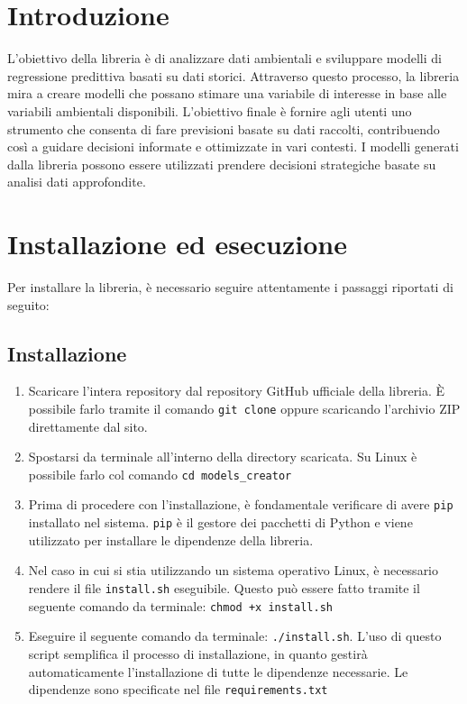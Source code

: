 \documentclass{rapportECL}
\newcommand{\rootDirectory}{models\_creator}
\begin{document}


        
\margins %
\mytitlepage %
\toc %



\cleardoublepage 

\chapter{Introduzione}

L'obiettivo della libreria è di analizzare dati ambientali e sviluppare modelli di regressione predittiva basati su dati storici. 
Attraverso questo processo, la libreria mira a creare modelli che possano stimare una variabile di interesse in base alle variabili ambientali disponibili. 
L'obiettivo finale è fornire agli utenti uno strumento che consenta di fare previsioni basate su dati raccolti, contribuendo così a guidare decisioni informate 
e ottimizzate in vari contesti. I modelli generati dalla libreria possono essere utilizzati prendere decisioni strategiche basate su analisi dati approfondite.

\chapter{Installazione ed esecuzione}
Per installare la libreria, è necessario seguire attentamente i passaggi riportati di seguito:

\section*{Installazione}
\begin{enumerate}
  \item Scaricare l'intera repository dal repository GitHub ufficiale della libreria. 
  È possibile farlo tramite il comando \texttt{git clone} oppure scaricando l'archivio ZIP direttamente dal sito.
  \item Spostarsi da terminale all'interno della directory scaricata. Su Linux è possibile farlo col comando \texttt{cd \rootDirectory}
  \item Prima di procedere con l'installazione, è fondamentale verificare di avere \texttt{pip} installato nel sistema. 
  \texttt{pip} è il gestore dei pacchetti di Python e viene utilizzato per installare le dipendenze della libreria.
  \item Nel caso in cui si stia utilizzando un sistema operativo Linux, è necessario rendere il file \texttt{install.sh} eseguibile. 
  Questo può essere fatto tramite il seguente comando da terminale: \texttt{chmod +x install.sh}
  \item Eseguire il seguente comando da terminale: \texttt{./install.sh}. L'uso di questo script semplifica il processo di installazione, 
  in quanto gestirà automaticamente l'installazione di tutte le dipendenze necessarie. Le dipendenze sono specificate nel file \texttt{requirements.txt}
\end{enumerate}
\end{document}
